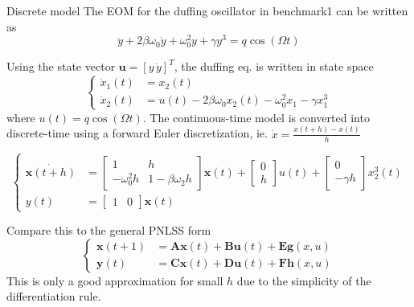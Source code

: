 \documentclass[9pt]{beamer}
\newcommand{\vect}[1]{\mathbf{#1}}
\begin{document}


\begin{frame}{Discrete model}
  The EOM for the duffing oscillator in benchmark1 can be written as
  \begin{equation}
    \label{eq:duffing}
    \ddot y + 2\beta\omega_0\dot y + \omega_0^2 y + \gamma y^3 = q\cos(\Omega t)
  \end{equation}

  Using the state vector $\vect u = [y\,\dot y]^T $, the duffing eq. is written in state space
  \begin{equation}
    \label{eq:duffing_ss_ct}
    \left\lbrace
      \begin{aligned}
        \dot x_1(t) &= x_2(t) \\
        \dot x_2(t) &= u(t) - 2\beta\omega_0x_2(t) - \omega_0^2x_1 - \gamma x_1^3
      \end{aligned}
    \right.
  \end{equation}
  where $u(t)=q\cos(\Omega t)$. The continuous-time model is converted into
  discrete-time using a forward Euler discretization, ie. $\dot x =
  \frac{x(t+h)-x(t)}{h}$

  \begin{equation}
    \label{eq:duffing_ss_dt}
    \left\lbrace
      \begin{aligned}
        \dot{\vect x(t+h)} &=
        \begin{bmatrix}
          1 & h \\ -\omega_0^2h & 1-\beta\omega_2h
        \end{bmatrix} \vect x(t) +
        \begin{bmatrix}
          0 \\ h
        \end{bmatrix} u(t) +
        \begin{bmatrix}
          0 \\ -\gamma h
        \end{bmatrix} x_2^3(t) \\
        y(t) &=
        \begin{bmatrix}
          1 & 0
        \end{bmatrix} \vect x(t)
      \end{aligned}
    \right.
  \end{equation}

  Compare this to the general PNLSS form
  \begin{equation}
    \label{eq:pnlss}
    \left\lbrace
      \begin{aligned}
        \vect x(t+1) &= \vect A \vect x(t) + \vect B \vect u(t) + \vect E \vect g(x,u) \\
        \vect y(t) &= \vect C \vect x(t) + \vect D \vect u(t) + \vect F \vect h(x,u)
      \end{aligned}
    \right.
  \end{equation}
  This is only a good approximation for small $h$ due to the simplicity of the
  differentiation rule.
\end{frame}
\end{document}
